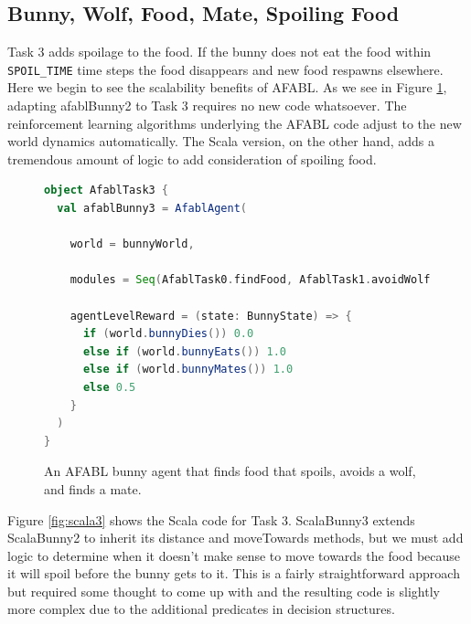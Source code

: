 \subsection{Bunny, Wolf, Food, Mate, Spoiling Food}

Task 3 adds spoilage to the food. If the bunny does not eat the food within {\tt SPOIL\_TIME} time steps the food disappears and new food respawns elsewhere. Here we begin to see the scalability benefits of AFABL. As we see in Figure \ref{fig:afabl3}, adapting afablBunny2 to Task 3 requires no new code whatsoever. The reinforcement learning algorithms underlying the AFABL code adjust to the new world dynamics automatically. The Scala version, on the other hand, adds a tremendous amount of logic to add consideration of spoiling food.

\begin{figure}[h]
\begin{lstlisting}[language=Scala]
object AfablTask3 {
  val afablBunny3 = AfablAgent(

    world = bunnyWorld,

    modules = Seq(AfablTask0.findFood, AfablTask1.avoidWolf, AfablTask2.findMate),

    agentLevelReward = (state: BunnyState) => {
      if (world.bunnyDies()) 0.0
      else if (world.bunnyEats()) 1.0
      else if (world.bunnyMates()) 1.0
      else 0.5
    }
  )
}
\end{lstlisting}
\caption{An AFABL bunny agent that finds food that spoils, avoids a wolf, and finds a mate.}
\label{fig:afabl3}
\end{figure}

Figure  \ref{fig:scala3} shows the Scala code for Task 3. ScalaBunny3 extends ScalaBunny2 to inherit its distance and moveTowards methods, but we must add logic to determine when it doesn't make sense to move towards the food because it will spoil before the bunny gets to it. This is a fairly straightforward approach but required some thought to come up with and the resulting code is slightly more complex due to the additional predicates in decision structures.

